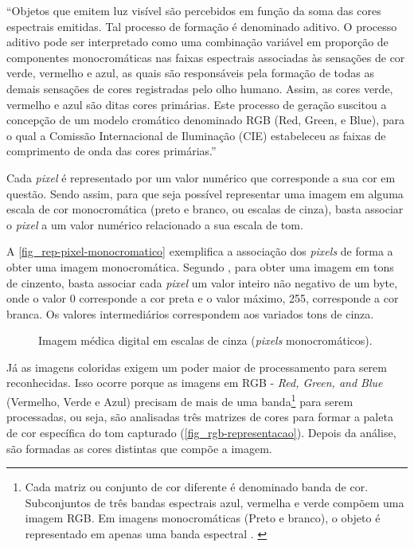 \begin{citacao}
“Objetos que emitem luz visível são percebidos em função da soma das cores espectrais emitidas. Tal processo de formação é denominado aditivo. O processo aditivo pode ser interpretado como uma combinação variável em proporção de componentes monocromáticas nas faixas espectrais associadas às sensações de cor verde, vermelho e azul, as quais são responsáveis pela formação de todas as demais sensações de cores registradas pelo olho humano. Assim, as cores verde, vermelho e azul são ditas cores primárias. Este processo de geração suscitou a concepção de um modelo cromático denominado RGB (Red, Green, e Blue), para o qual a Comissão Internacional de Iluminação (CIE) estabeleceu as faixas de comprimento de onda das cores primárias.” \cite{QUEIROZ2006}
\end{citacao}

Cada \textit{pixel} é representado por um valor numérico que corresponde a sua cor em questão. Sendo assim, para que seja possível representar uma imagem em alguma escala de cor monocromática (preto e branco, ou escalas de cinza), basta associar o \textit{pixel} a um valor numérico relacionado a sua escala de tom.

A \autoref{fig_rep-pixel-monocromatico} exemplifica a associação dos \textit{pixels} de forma a obter uma imagem monocromática. Segundo , para obter uma imagem em tons de cinzento, basta associar cada \textit{pixel} um valor inteiro não negativo de um byte, onde o valor 0 corresponde a cor preta e o valor máximo, 255, corresponde a cor branca. Os valores intermediários correspondem aos variados tons de cinza.

\begin{figure}[h]
	\caption{\label{fig_rep-pixel-monocromatico}Imagem médica digital em escalas de cinza (\textit{pixels} monocromáticos).}
	\begin{center}
	\end{center}
	\centering {}
\end{figure}

Já as imagens coloridas exigem um poder maior de processamento para serem reconhecidas. Isso ocorre porque as imagens em RGB - \textit{Red, Green, and Blue} (Vermelho, Verde e Azul)  precisam de mais de uma banda\footnote{Cada matriz ou conjunto de cor diferente é denominado banda de cor. Subconjuntos de três bandas espectrais azul, vermelha e verde compõem uma imagem RGB. Em imagens monocromáticas (Preto e branco), o objeto é representado em apenas uma banda espectral \cite{CROSTA1999}. \label{Banda-de-Cor}} para serem processadas, ou seja, são analisadas três matrizes de cores para formar a paleta de cor específica do tom capturado (\autoref{fig_rgb-representacao}). Depois da análise, são formadas as cores distintas que compõe a imagem.

